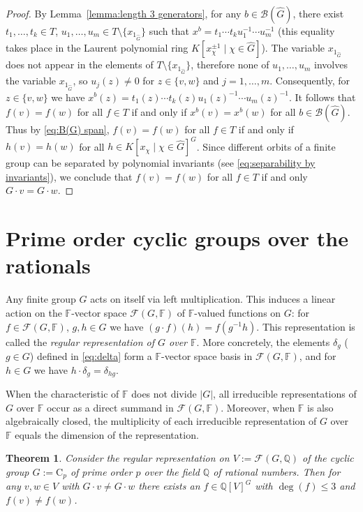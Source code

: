 \documentclass[12pt, oneside]{amsart}
\newtheorem{theorem}{\bf Theorem}[section]
\def\field{K}
\def\QQ{\mathbb{Q}}
\def\FF{\mathbb{F}}
\begin{document}
\begin{proof} 
 By Lemma~\ref{lemma:length 3 generators}, for any $b\in  \mathcal{B}(\widehat G)$, 
 there exist $t_1,\dots,t_k\in T$, $u_1,\dots,u_m\in T\setminus \{x_{1_{\widehat G}}\}$ such that  
 $x^b=t_1\cdots t_ku_1^{-1}\cdots u_m^{-1}$ (this  equality takes place in the 
 Laurent polynomial ring  $\field[x_\chi^{\pm 1}\mid \chi\in \widehat G]$). 
The variable $x_{1_{\widehat G}}$ does not appear in the elements of $T\setminus\{x_{1_{\widehat G}}\}$, 
therefore none of $u_1,\dots,u_m$ involves the variable  $x_{1_{\widehat G}}$, 
so $u_j(z)\neq 0$ for $z\in \{v,w\}$ and $j=1,\dots,m$.  
 Consequently, for $z\in \{v,w\}$ we have 
 $x^b(z)=t_1(z)\cdots t_k(z)u_1(z)^{-1}\cdots u_m(z)^{-1}$. 
 It follows that $f(v)=f(w)$ for all $f\in T$ if and only if $x^b(v)=x^b(w)$ for all 
 $b\in \mathcal{B}(\widehat G)$. 
Thus by \eqref{eq:B(G) span}, $f(v)=f(w)$ for all $f\in T$ if and only if $h(v)=h(w)$ for all 
$h\in \field[x_\chi\mid \chi\in \widehat G]^G$. 
Since different orbits of a finite group can be separated by polynomial invariants 
(see \eqref{eq:separability by invariants}), 
we conclude that $f(v)=f(w)$ for all $f\in T$ if and only 
$G\cdot v=G\cdot w$. 
 \end{proof} 

\section{Prime order cyclic groups over the rationals} \label{sec:rational} 


Any finite group  $G$ acts on itself via left multiplication. This induces a linear action on the 
$\FF$-vector space $\mathcal{F}(G,\FF)$ of $\FF$-valued functions on $G$: 
for $f\in \mathcal{F}(G,\FF)$, $g,h\in G$ we have $(g\cdot f)(h)=f(g^{-1}h)$. 
This representation 
is called the \emph{regular representation of $G$ over $\FF$}. 
More concretely, the elements $\delta_g$ ($g\in G$) defined in \eqref{eq:delta} 
form a $\FF$-vector space basis in $\mathcal{F}(G,\FF)$, and for $h\in G$ we have 
$h\cdot \delta_g=\delta_{hg}$.  

When the characteristic of $\FF$ does not divide $|G|$, all irreducible representations 
of $G$ over $\FF$ occur as a direct summand in $\mathcal{F}(G,\FF)$.  Moreover, when 
$\FF$ is also algebraically closed, the multiplicity 
of each irreducible representation   of $G$ over 
$\FF$ equals the dimension of the representation. 

\begin{theorem}\label{thm:main}  
Consider the regular representation on $V:=\mathcal{F}(G,\QQ)$ of the cyclic group $G:=\mathrm{C}_p$  of  prime order $p$
over the field $\QQ$ of rational numbers. 
Then for any $v,w\in V$ with $G\cdot v\neq G\cdot w$ there exists an 
$f\in \QQ[V]^G$ with $\deg(f)\le 3$ and $f(v)\neq f(w)$. 
\end{theorem} 
\end{document}
